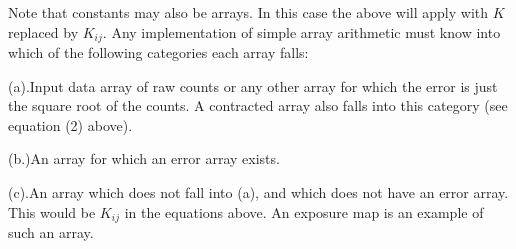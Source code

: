 \blankpar
Note that constants may also be arrays.  In this case the above will
apply with $K$ replaced by $K_{ij}$. 
\blankpar
Any implementation of simple array arithmetic must know into which of the
following categories each array falls:

\item{(a).}Input data array of raw counts or any other array for which
the error is just the square root of the counts.  A contracted array
also falls into this category (see equation (2) above).

\item{(b.)}An array for which an error array exists.

\item{(c).}An array which does not fall into (a), and which does
not have an error array.  This would be $K_{ij}$ in the equations above.
An exposure map is an example of such an array.

